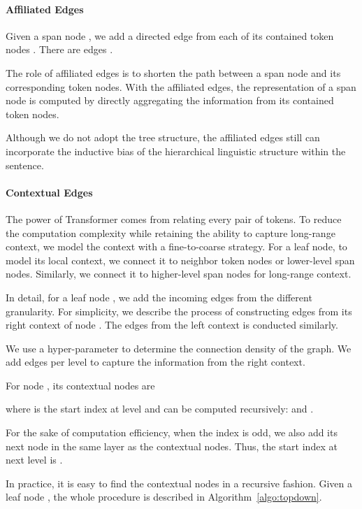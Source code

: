 \documentclass[11pt,a4paper]{article}
\begin{document}
\paragraph{Affiliated Edges}

Given a span node , we add a directed edge from each of its contained token nodes . There are  edges .


The role of affiliated edges is to shorten the path between a span node and its corresponding token nodes.
With the affiliated edges, the representation of a span node is computed by directly aggregating the information from its contained token nodes.


Although we do not adopt the tree structure, the affiliated edges still can incorporate the inductive bias of the hierarchical linguistic structure within the sentence.


\paragraph{Contextual Edges}

The power of Transformer comes from relating every pair of tokens. To reduce the computation complexity while retaining the ability to capture long-range context, we model the context with a fine-to-coarse strategy. For a leaf node, to model its local context, we connect it to neighbor token nodes or lower-level span nodes. Similarly, we connect it to higher-level span nodes for long-range context.



In detail, for a leaf node , we add the incoming edges from the different granularity. For simplicity, we describe the process of constructing edges from its right context of node . The edges from the left context is conducted similarly.

We use a hyper-parameter  to determine the connection density of the graph. We add  edges per level to capture the information from the right context.

For node , its contextual nodes are

where  is the start index at level  and can be computed recursively:  and .

For the sake of computation efficiency, when the index  is odd, we also add its next node in the same layer as the contextual nodes. Thus, the start index at next level is .




In practice, it is easy to find the contextual nodes in a recursive fashion.
Given a leaf node , the whole procedure is described in Algorithm~\ref{algo:topdown}.
\end{document}

